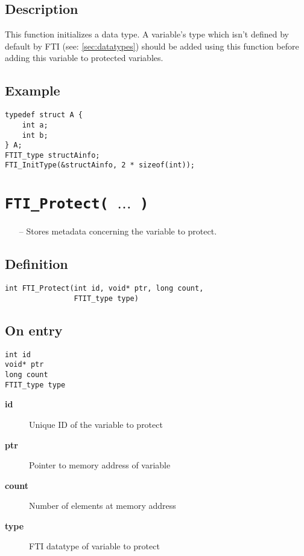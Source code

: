\documentclass{refrep}
\begin{document}
\subsection*{Description}
This function initializes a data type. A variable's type which isn't defined by default by FTI (see: \ref{sec:datatypes}) should be added using this function before adding this variable to protected variables.
\subsection*{Example}
\begin{center}
\begin{lstlisting}[frame=single]
typedef struct A {
    int a;
    int b;
} A;
FTIT_type structAinfo;
FTI_InitType(&structAinfo, 2 * sizeof(int));
\end{lstlisting}
\end{center}
\newpage
\section{\tt FTI\_Protect( $\dots$ )}\label{sec:ftiprotect}
\begin{framed}
\begin{itemize}
\item[--] Stores metadata concerning the variable to protect.
\end{itemize}
\end{framed}
\subsection*{Definition}
\begin{lstlisting}[frame=single]
int FTI_Protect(int id, void* ptr, long count,
                FTIT_type type)
\end{lstlisting}
\subsection*{On entry}
\begin{lstlisting}[frame=single]
int id
void* ptr
long count
FTIT_type type
\end{lstlisting}
\begin{description}
\item[\textbf{id}] Unique ID of the variable to protect
\item[\textbf{ptr}] Pointer to memory address of variable
\item[\textbf{count}] Number of elements at memory address
\item[\textbf{type}] FTI datatype of variable to protect
\end{description}
\end{document}
